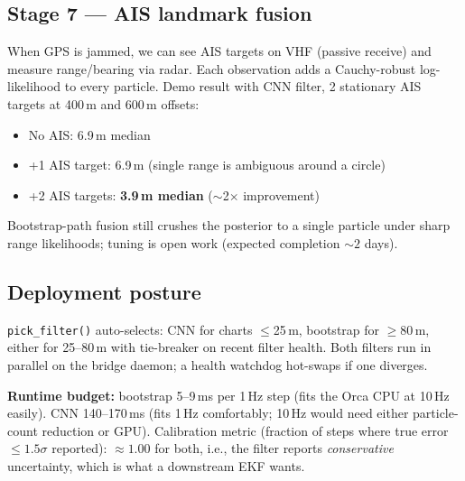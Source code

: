 \documentclass[10pt,a4paper]{article}
\begin{document}
\subsection{Stage 7 — AIS landmark fusion}
When GPS is jammed, we can see AIS targets on VHF (passive receive) and
measure range/bearing via radar. Each observation adds a Cauchy-robust
log-likelihood to every particle. Demo result with CNN filter,
2 stationary AIS targets at 400\,m and 600\,m offsets:
\begin{itemize}
\item No AIS: 6.9\,m median
\item +1 AIS target: 6.9\,m (single range is ambiguous around a circle)
\item +2 AIS targets: \textbf{3.9\,m median} ($\sim$2$\times$ improvement)
\end{itemize}
Bootstrap-path fusion still crushes the posterior to a single particle
under sharp range likelihoods; tuning is open work (expected
completion ${\sim}2$ days).

\subsection{Deployment posture}
\texttt{pick\_filter()} auto-selects: CNN for charts $\leq$25\,m,
bootstrap for $\geq$80\,m, either for 25--80\,m with tie-breaker on
recent filter health. Both filters run in parallel on the bridge
daemon; a health watchdog hot-swaps if one diverges.

\textbf{Runtime budget:} bootstrap 5--9\,ms per 1\,Hz step (fits the
Orca CPU at 10\,Hz easily). CNN 140--170\,ms (fits 1\,Hz comfortably;
10\,Hz would need either particle-count reduction or GPU). Calibration
metric (fraction of steps where true error $\leq 1.5\sigma$ reported):
$\approx 1.00$ for both, i.e., the filter reports \emph{conservative}
uncertainty, which is what a downstream EKF wants.

\pagebreak

\end{document}
